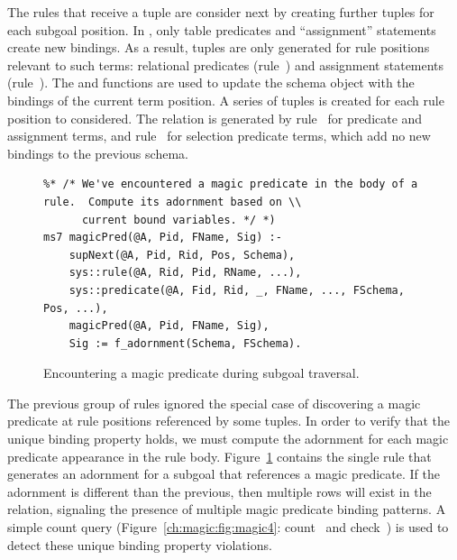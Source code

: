The rules that receive a  tuple are consider next by creating further
 tuples for each subgoal position.  In \OVERLOG, only table predicates
and ``assignment'' statements create new bindings.  As a result, 
tuples are only generated for rule positions relevant to such terms: relational
predicates (rule~) and assignment statements (rule~).  The
 and  functions are used to update the
schema object with the bindings of the current term position.  A series of
 tuples is created for each rule position to considered.  The
 relation is generated by rule~ for predicate and
assignment terms, and rule~ for selection predicate terms, which add no
new bindings to the previous schema.


\begin{figure}[!t]
\ssp
\centering
\begin{lstlisting}
%* /* We've encountered a magic predicate in the body of a rule.  Compute its adornment based on \\
      current bound variables. */ *)
ms7 magicPred(@A, Pid, FName, Sig) :-
    supNext(@A, Pid, Rid, Pos, Schema),
    sys::rule(@A, Rid, Pid, RName, ...),
    sys::predicate(@A, Fid, Rid, _, FName, ..., FSchema, Pos, ...),
    magicPred(@A, Pid, FName, Sig),
    Sig := f_adornment(Schema, FSchema).
\end{lstlisting}
\caption{\label{ch:magic:fig:magic3}Encountering a magic predicate during subgoal traversal.}
\end{figure}

The previous group of rules ignored the special case of discovering a magic
predicate at rule positions referenced by some  tuples.  In order
to verify that the unique binding property holds, we must compute the adornment
for each magic predicate appearance in the rule body.
Figure~\ref{ch:magic:fig:magic3} contains the single rule that generates an
adornment for a subgoal that references a magic predicate.  If the adornment is
different than the previous, then multiple rows will exist in the
 relation, signaling the presence of multiple magic predicate
binding patterns.  A simple count query (Figure~\ref{ch:magic:fig:magic4}:
count~ and check~) is used to detect these unique binding
property violations.


